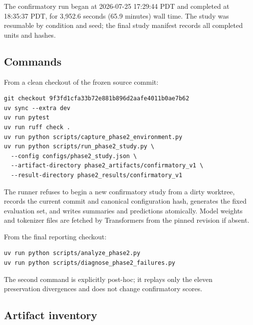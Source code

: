 \documentclass[11pt]{article}
\begin{document}
The confirmatory run began at 2026-07-25 17:29:44 PDT and completed at
18:35:37 PDT, for 3,952.6 seconds (65.9 minutes) wall time. The study was
resumable by condition and seed; the final study manifest records all completed
units and hashes.

\subsection{Commands}

From a clean checkout of the frozen source commit:

\begin{verbatim}
git checkout 9f3fd1cfa33b72e881b896d2aafe4011b0ae7b62
uv sync --extra dev
uv run pytest
uv run ruff check .
uv run python scripts/capture_phase2_environment.py
uv run python scripts/run_phase2_study.py \
  --config configs/phase2_study.json \
  --artifact-directory phase2_artifacts/confirmatory_v1 \
  --result-directory phase2_results/confirmatory_v1
\end{verbatim}

The runner refuses to begin a new confirmatory study from a dirty worktree,
records the current commit and canonical configuration hash, generates the
fixed evaluation set, and writes summaries and predictions atomically. Model
weights and tokenizer files are fetched by Transformers from the pinned
revision if absent.

From the final reporting checkout:

\begin{verbatim}
uv run python scripts/analyze_phase2.py
uv run python scripts/diagnose_phase2_failures.py
\end{verbatim}

The second command is explicitly post-hoc; it replays only the eleven
preservation divergences and does not change confirmatory scores.

\subsection{Artifact inventory}
\end{document}

